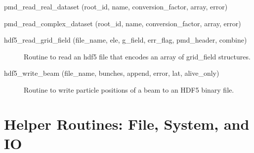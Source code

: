 \begin{description}
\label{r:pmd.read.real.dataset}
\item[pmd_read_real_dataset (root_id, name, conversion_factor, array, error)] \Newline 

\label{r:pmd.read.complex.dataset}
\item[pmd_read_complex_dataset (root_id, name, conversion_factor, array, error)] \Newline 

\label{r:hdf5.read.grid.field}
\item[hdf5_read_grid_field (file_name, ele, g_field, err_flag, pmd_header, combine)] \Newline 
Routine to read an hdf5 file that encodes an array of grid_field structures.


\label{r:hdf5.write.beam}
\item[hdf5_write_beam (file_name, bunches, append, error, lat, alive_only)] \Newline 
Routine to write particle positions of a beam to an HDF5 binary file.

\end{description}

\section{Helper Routines: File, System, and IO}
\label{r:helper.file}

